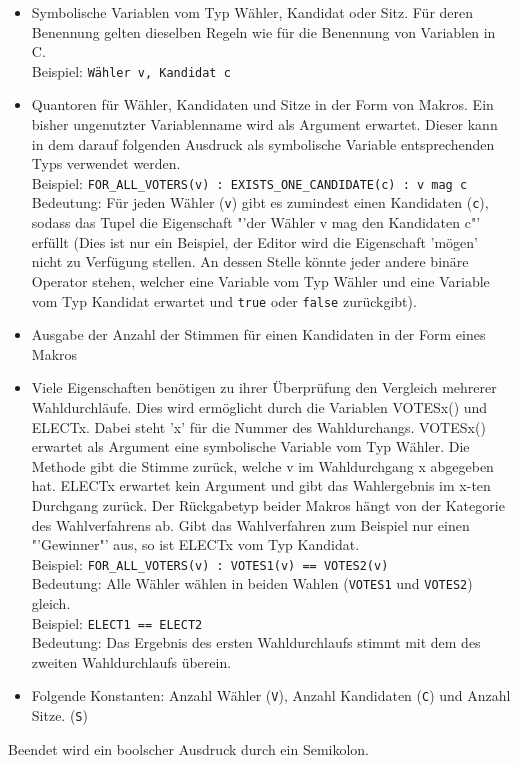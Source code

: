 \documentclass[a4paper]{scrreprt}
\begin{document}
\begin{itemize}
\item Symbolische Variablen vom Typ Wähler, Kandidat oder Sitz. Für deren Benennung gelten dieselben Regeln wie für die Benennung von Variablen in C. \\

Beispiel: \verb!Wähler v, Kandidat c!

\item Quantoren für Wähler, Kandidaten und Sitze in der Form von \gls{Makro}s. Ein bisher ungenutzter Variablenname wird als Argument erwartet. Dieser kann in dem darauf folgenden Ausdruck als symbolische Variable entsprechenden Typs verwendet werden. \\

Beispiel: \verb|FOR_ALL_VOTERS(v) : EXISTS_ONE_CANDIDATE(c) : v mag c| \\
Bedeutung: Für jeden Wähler (\verb!v!) gibt es zumindest einen Kandidaten (\verb!c!), sodass das Tupel die Eigenschaft "'der Wähler v mag den Kandidaten c"' erfüllt (Dies ist nur ein Beispiel, der Editor wird die Eigenschaft 'mögen' nicht zu Verfügung stellen. An dessen Stelle könnte jeder andere binäre Operator stehen, welcher eine Variable vom Typ Wähler und eine Variable vom Typ Kandidat erwartet und \texttt{true} oder \texttt{false} zurückgibt).

\item Ausgabe der Anzahl der Stimmen für einen Kandidaten in der Form eines Makros

\item Viele Eigenschaften benötigen zu ihrer Überprüfung den Vergleich mehrerer Wahldurchläufe. Dies wird ermöglicht durch die Variablen VOTESx() und ELECTx. Dabei steht 'x' für die Nummer des Wahldurchangs. VOTESx() erwartet als Argument eine symbolische Variable vom Typ Wähler. Die Methode gibt die Stimme zurück, welche v im Wahldurchgang x abgegeben hat. ELECTx erwartet kein Argument und gibt das Wahlergebnis im x-ten Durchgang zurück. Der Rückgabetyp beider Makros hängt von der Kategorie des Wahlverfahrens ab. Gibt das Wahlverfahren zum Beispiel nur einen "'Gewinner"' aus, so ist ELECTx vom Typ Kandidat. \\

Beispiel: \verb|FOR_ALL_VOTERS(v) : VOTES1(v) == VOTES2(v)| \\
Bedeutung: Alle Wähler wählen in beiden Wahlen (\verb!VOTES1! und \verb!VOTES2!) gleich. \\

Beispiel: \verb|ELECT1 == ELECT2| \\
Bedeutung: Das Ergebnis des ersten Wahldurchlaufs stimmt mit dem des zweiten Wahldurchlaufs überein.
\item Folgende Konstanten: Anzahl Wähler (\verb!V!), Anzahl Kandidaten (\verb!C!) und Anzahl Sitze. (\verb!S!)
\end{itemize}
Beendet wird ein boolscher Ausdruck durch ein Semikolon. 
\end{document}
